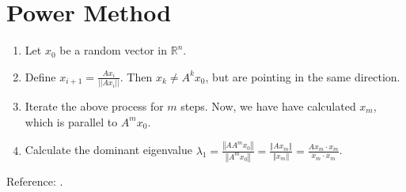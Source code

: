 \documentclass{article}
\begin{document}

\section{Power Method}

\begin{tcolorbox}[title={Power Method},colback=red!5!white,colframe=red!75!black,parbox=false]
	\begin{enumerate}
		\item Let $x_0$ be a random vector in $\mathbb R^n$.
		\item Define $\displaystyle x_{i+1}=\frac{Ax_i}{||Ax_i||}$. Then $x_k\neq A^kx_0$, but are pointing in the same direction.
		\item Iterate the above process for $m$ steps. Now, we have have calculated $x_m$, which is parallel to $A^m x_0$.
		\item Calculate the dominant eigenvalue $\displaystyle \lambda_1=\frac{\left\Vert A A^m x_0 \right\Vert}{\left\Vert A^m x_0 \right\Vert}=\frac{\left\Vert A x_m\right\Vert}{\left\Vert x_m \right\Vert}=\frac{Ax_m\cdot x_m}{x_m \cdot x_m}$.
	\end{enumerate}
	Reference: \cite{kochlab}.
\end{tcolorbox}
\end{document}
